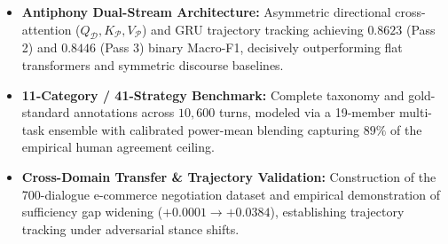 \begin{summarybox}
\begin{itemize}
  \item \textbf{Antiphony Dual-Stream Architecture:} Asymmetric directional cross-attention ($Q_{\mathcal{D}}, K_{\mathcal{P}}, V_{\mathcal{P}}$) and GRU trajectory tracking achieving $0.8623$ (Pass 2) and $0.8446$ (Pass 3) binary Macro-F1, decisively outperforming flat transformers and symmetric discourse baselines.
  \item \textbf{11-Category / 41-Strategy Benchmark:} Complete taxonomy and gold-standard annotations across $10{,}600$ turns, modeled via a 19-member multi-task ensemble with calibrated power-mean blending capturing $89\%$ of the empirical human agreement ceiling.
  \item \textbf{Cross-Domain Transfer \& Trajectory Validation:} Construction of the 700-dialogue e-commerce negotiation dataset and empirical demonstration of sufficiency gap widening ($+0.0001 \to +0.0384$), establishing trajectory tracking under adversarial stance shifts.
\end{itemize}
\end{summarybox}

